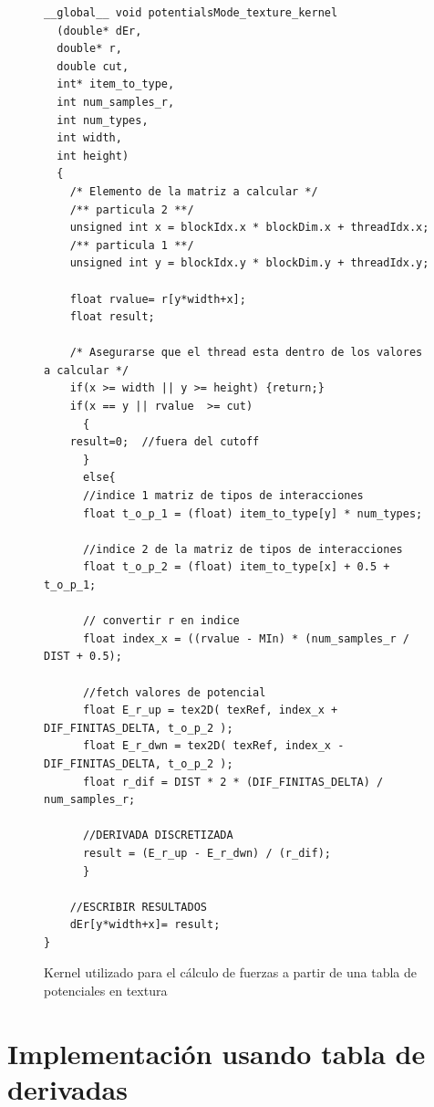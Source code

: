 \begin{figure}[htbp]
    \begin{lstlisting}
__global__ void potentialsMode_texture_kernel
  (double* dEr,
  double* r, 
  double cut, 
  int* item_to_type, 
  int num_samples_r, 
  int num_types, 
  int width, 
  int height)
  {
    /* Elemento de la matriz a calcular */
    /** particula 2 **/
    unsigned int x = blockIdx.x * blockDim.x + threadIdx.x;	
    /** particula 1 **/
    unsigned int y = blockIdx.y * blockDim.y + threadIdx.y;
    
    float rvalue= r[y*width+x]; 
    float result;
    
    /* Asegurarse que el thread esta dentro de los valores a calcular */
    if(x >= width || y >= height) {return;}
    if(x == y || rvalue  >= cut) 
      {
	result=0;  //fuera del cutoff
      }
      else{
      //indice 1 matriz de tipos de interacciones
      float t_o_p_1 = (float) item_to_type[y] * num_types;	
      
      //indice 2 de la matriz de tipos de interacciones
      float t_o_p_2 = (float) item_to_type[x] + 0.5 + t_o_p_1;	
      
      // convertir r en indice
      float index_x = ((rvalue - MIn) * (num_samples_r / DIST + 0.5);	
      
      //fetch valores de potencial
      float E_r_up = tex2D( texRef, index_x + DIF_FINITAS_DELTA, t_o_p_2 );
      float E_r_dwn = tex2D( texRef, index_x - DIF_FINITAS_DELTA, t_o_p_2 );
      float r_dif = DIST * 2 * (DIF_FINITAS_DELTA) / num_samples_r;
      
      //DERIVADA DISCRETIZADA
      result = (E_r_up - E_r_dwn) / (r_dif); 
      }
   
    //ESCRIBIR RESULTADOS
    dEr[y*width+x]= result;
}
    \end{lstlisting}
    \caption{Kernel utilizado para el cálculo de fuerzas a partir de una tabla de potenciales en textura}
    \label{code:potentialsKernel}
\end{figure}



\section{Implementación usando tabla de derivadas}


